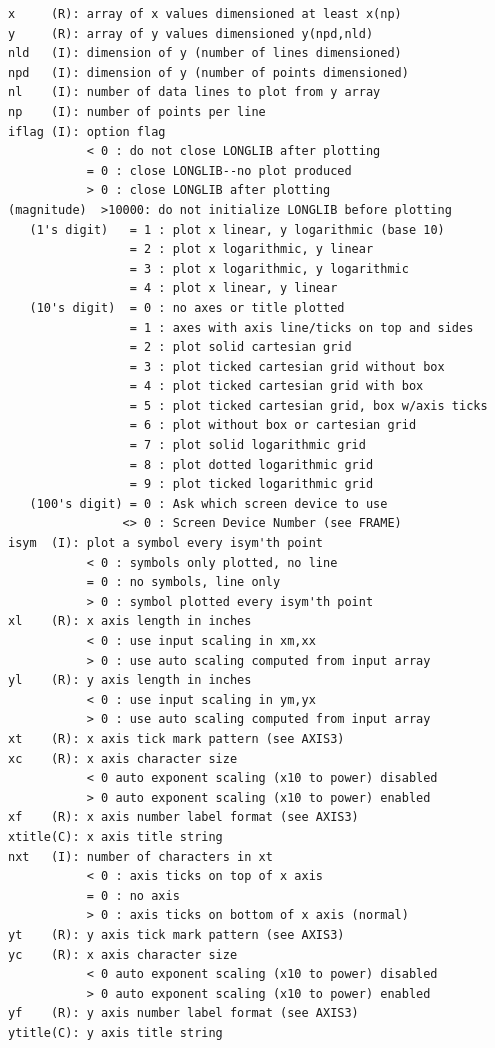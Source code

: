 \documentclass[11pt]{report}
\begin{document}
\begin{verbatim}
x     (R): array of x values dimensioned at least x(np)
y     (R): array of y values dimensioned y(npd,nld)
nld   (I): dimension of y (number of lines dimensioned)
npd   (I): dimension of y (number of points dimensioned)
nl    (I): number of data lines to plot from y array
np    (I): number of points per line
iflag (I): option flag
           < 0 : do not close LONGLIB after plotting
           = 0 : close LONGLIB--no plot produced
           > 0 : close LONGLIB after plotting
(magnitude)  >10000: do not initialize LONGLIB before plotting
   (1's digit)   = 1 : plot x linear, y logarithmic (base 10)
                 = 2 : plot x logarithmic, y linear
                 = 3 : plot x logarithmic, y logarithmic
                 = 4 : plot x linear, y linear
   (10's digit)  = 0 : no axes or title plotted
                 = 1 : axes with axis line/ticks on top and sides
                 = 2 : plot solid cartesian grid
                 = 3 : plot ticked cartesian grid without box
                 = 4 : plot ticked cartesian grid with box
                 = 5 : plot ticked cartesian grid, box w/axis ticks
                 = 6 : plot without box or cartesian grid
                 = 7 : plot solid logarithmic grid
                 = 8 : plot dotted logarithmic grid
                 = 9 : plot ticked logarithmic grid
   (100's digit) = 0 : Ask which screen device to use
                <> 0 : Screen Device Number (see FRAME)
isym  (I): plot a symbol every isym'th point
           < 0 : symbols only plotted, no line
           = 0 : no symbols, line only
           > 0 : symbol plotted every isym'th point
xl    (R): x axis length in inches
           < 0 : use input scaling in xm,xx
           > 0 : use auto scaling computed from input array
yl    (R): y axis length in inches
           < 0 : use input scaling in ym,yx
           > 0 : use auto scaling computed from input array
xt    (R): x axis tick mark pattern (see AXIS3)
xc    (R): x axis character size
           < 0 auto exponent scaling (x10 to power) disabled
           > 0 auto exponent scaling (x10 to power) enabled
xf    (R): x axis number label format (see AXIS3)
xtitle(C): x axis title string
nxt   (I): number of characters in xt
           < 0 : axis ticks on top of x axis
           = 0 : no axis
           > 0 : axis ticks on bottom of x axis (normal)
yt    (R): y axis tick mark pattern (see AXIS3)
yc    (R): x axis character size
           < 0 auto exponent scaling (x10 to power) disabled
           > 0 auto exponent scaling (x10 to power) enabled
yf    (R): y axis number label format (see AXIS3)
ytitle(C): y axis title string

\end{verbatim}
\end{document}
